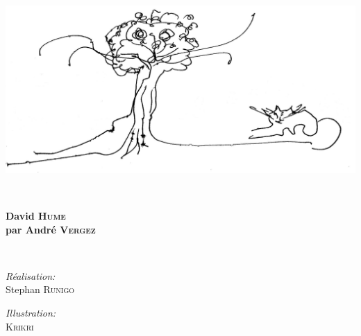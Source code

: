 \begin{titlepage}
%
~\\[1cm]

\begin{center}
\includegraphics[scale=0.9]{./presentation/arbre}
\end{center}

\textsc{\Large }\\[2.0cm]

\HRule

\begin{center}
{\huge \bfseries  David \textsc{Hume}\\
\Large par André \textsc{Vergez}\\%
 }
\end{center}

\HRule \\[2.5cm]


\begin{minipage}{0.4\textwidth}
\begin{flushleft} \large
\emph{Réalisation:}\\
Stephan \textsc{Runigo}
\end{flushleft}
\end{minipage}
\begin{minipage}{0.4\textwidth}
\begin{flushright} \large
\emph{Illustration:}\\
\textsc{Krikri}
\end{flushright}
\end{minipage}

\vfill


\end{titlepage}
